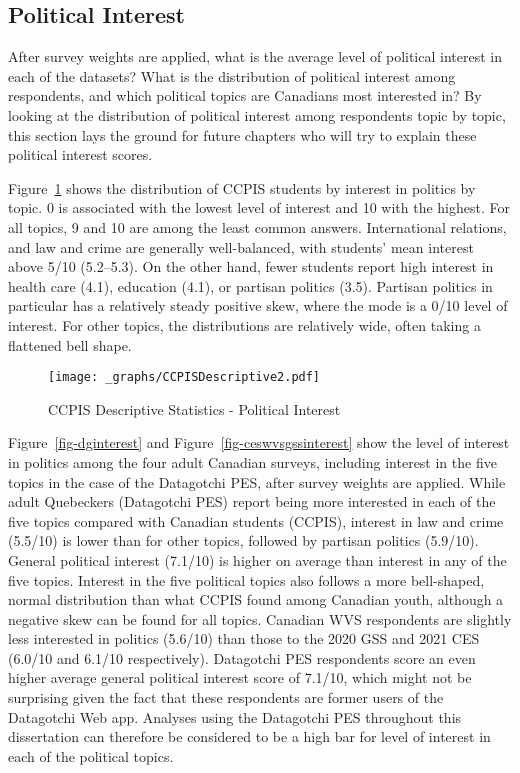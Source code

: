 \documentclass[
  letterpaper,
  DIV=11,
  numbers=noendperiod]{scrreprt}
\begin{document}
\hypertarget{political-interest}{%
\subsection{Political Interest}\label{political-interest}}

After survey weights are applied, what is the average level of political
interest in each of the datasets? What is the distribution of political
interest among respondents, and which political topics are Canadians
most interested in? By looking at the distribution of political interest
among respondents topic by topic, this section lays the ground for
future chapters who will try to explain these political interest scores.

Figure~\ref{fig-ccpis2} shows the distribution of CCPIS students by
interest in politics by topic. 0 is associated with the lowest level of
interest and 10 with the highest. For all topics, 9 and 10 are among the
least common answers. International relations, and law and crime are
generally well-balanced, with students' mean interest above 5/10
(5.2--5.3). On the other hand, fewer students report high interest in
health care (4.1), education (4.1), or partisan politics (3.5). Partisan
politics in particular has a relatively steady positive skew, where the
mode is a 0/10 level of interest. For other topics, the distributions
are relatively wide, often taking a flattened bell shape.

\begin{figure}

{\centering \texttt{[image: \_graphs/CCPISDescriptive2.pdf]}

}

\caption{\label{fig-ccpis2}CCPIS Descriptive Statistics - Political
Interest}

\end{figure}

Figure~\ref{fig-dginterest} and Figure~\ref{fig-ceswvsgssinterest} show
the level of interest in politics among the four adult Canadian surveys,
including interest in the five topics in the case of the Datagotchi PES,
after survey weights are applied. While adult Quebeckers (Datagotchi
PES) report being more interested in each of the five topics compared
with Canadian students (CCPIS), interest in law and crime (5.5/10) is
lower than for other topics, followed by partisan politics (5.9/10).
General political interest (7.1/10) is higher on average than interest
in any of the five topics. Interest in the five political topics also
follows a more bell-shaped, normal distribution than what CCPIS found
among Canadian youth, although a negative skew can be found for all
topics. Canadian WVS respondents are slightly less interested in
politics (5.6/10) than those to the 2020 GSS and 2021 CES (6.0/10 and
6.1/10 respectively). Datagotchi PES respondents score an even higher
average general political interest score of 7.1/10, which might not be
surprising given the fact that these respondents are former users of the
Datagotchi Web app. Analyses using the Datagotchi PES throughout this
dissertation can therefore be considered to be a high bar for level of
interest in each of the political topics.
\end{document}
